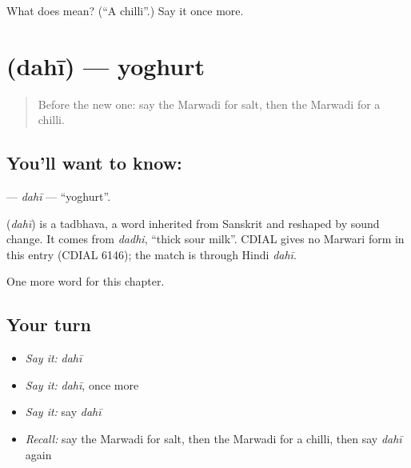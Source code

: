 \begin{tcolorbox}[breakable,colback=teal!4,colframe=teal!35!black,title={Before you move on}]
What does  mean? (\textquotedblleft{}A chilli\textquotedblright{}.) Say it once more.
\end{tcolorbox}
\section[\texorpdfstring{\mw{दही} (dahī)}{दही (dahī)}]{ (dahī) — yoghurt}

\label{lesson:MW-C60-dahi}



\begin{quote}
Before the new one: say the Marwadi for salt, then the Marwadi for a chilli.
\end{quote}

\subsection*{You'll want to know: }
\textbf{} — \emph{dahī} — \textquotedblleft{}yoghurt\textquotedblright{}.

\begin{cousinweb}
\textbf{} (\emph{dahī}) is a tadbhava, a word inherited from Sanskrit and reshaped by sound change. It comes from \emph{dadhi}, \textquotedblleft{}thick sour milk\textquotedblright{}. CDIAL gives no Marwari form in this entry (CDIAL 6146); the match is through Hindi \emph{dahī}.
\end{cousinweb}

\begin{grammarlens}[title={What you've built}]
One more word for this chapter.
\end{grammarlens}

\subsection*{Your turn}
\begin{itemize}
\raggedright
  \item \emph{Say it:} \emph{dahī}
  \item \emph{Say it:} \emph{dahī}, once more
  \item \emph{Say it:} say \emph{dahī}
  \item \emph{Recall:} say the Marwadi for salt, then the Marwadi for a chilli, then say \emph{dahī} again
\end{itemize}

